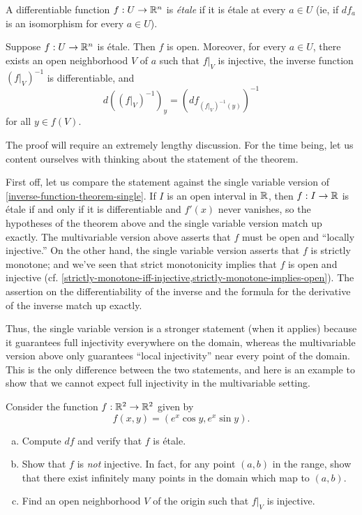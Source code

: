 \begin{definition}
	A differentiable function $f : U \to \mathbb{R}^n$ is \emph{\'etale} if it is \'etale at every $a \in U$ (ie, if $df_a$ is an isomorphism for every $a \in U$). 
\end{definition}

\begin{theorem} \label{inverse-function-theorem}
	Suppose $f : U \to \mathbb{R}^n$ is \'etale. Then $f$ is open. Moreover, for every $a \in U$, there exists an open neighborhood $V$ of $a$ such that $f|_V$ is injective, the inverse function $(f|_V)^{-1}$ is differentiable, and
	\[ d((f|_V)^{-1})_y = (df_{(f|_V)^{-1}(y)})^{-1} \]
	for all $y  \in f(V)$. 
\end{theorem}

The proof will require an extremely lengthy discussion. For the time being, let us content ourselves with thinking about the statement of the theorem. 

First off, let us compare the statement against the single variable version of \cref{inverse-function-theorem-single}. If $I$ is an open interval in $\mathbb{R}$, then $f : I \to \mathbb{R}$ is \'etale if and only if it is differentiable and $f'(x)$ never vanishes, so the hypotheses of the theorem above and the single variable version match up exactly. The multivariable version above asserts that $f$ must be open and ``locally injective.'' On the other hand, the single variable version asserts that $f$ is strictly monotone; and we've seen that strict monotonicity implies that $f$ is open and injective (cf. \cref{strictly-monotone-iff-injective,strictly-monotone-implies-open}). The assertion on the differentiability of the inverse and the formula for the derivative of the inverse match up exactly.  

Thus, the single variable version is a stronger statement (when it applies) because it guarantees full injectivity everywhere on the domain, whereas the multivariable version above only guarantees ``local injectivity'' near every point of the domain. This is the only difference between the two statements, and here is an example to show that we cannot expect full injectivity in the multivariable setting.  

\begin{exercise} \label{locally-injective-not-injective}
	Consider the function $f : \mathbb{R}^2 \to \mathbb{R}^2$ given by 
	\[ f(x,y) = (e^x \cos y, e^x \sin y). \]
	\begin{enumerate}[(a)]
		\item Compute $df$ and verify that $f$ is \'etale. 
		\item Show that $f$ is \emph{not} injective. In fact, for any point $(a,b)$ in the range, show that there exist infinitely many points in the domain which map to $(a,b)$.
		\item Find an open neighborhood $V$ of the origin such that $f|_V$ is injective. 
	\end{enumerate}
\end{exercise}

